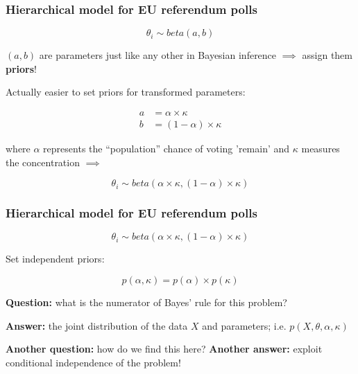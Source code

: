 \documentclass[handout]{beamer}
\begin{document}
\begin{frame}
	\frametitle{Hierarchical model for EU referendum polls}
	\begin{equation}
	\theta_i \sim beta(a,b)
	\end{equation} 
	
	 $(a,b)$ are parameters just like any other in Bayesian inference $\implies$ assign them \textbf{priors}!
	
	 Actually easier to set priors for transformed parameters:
	
	\begin{align*}
	a &= \alpha \times \kappa\\
	b &= (1-\alpha) \times \kappa
	\end{align*}
	
	 where $\alpha$ represents the ``population'' chance of voting 'remain' and $\kappa$ measures the concentration $\implies$
	
	\begin{equation}
	\theta_i \sim beta(\alpha \times \kappa,(1-\alpha) \times \kappa)
	\end{equation}
	
\end{frame}

\begin{frame}
	\frametitle{Hierarchical model for EU referendum polls}
	
	\begin{equation}
	\theta_i \sim beta(\alpha \times \kappa,(1-\alpha) \times \kappa)
	\end{equation}
	
	 Set independent priors:
	
	\begin{equation}
	p(\alpha,\kappa) = p(\alpha) \times p(\kappa)
	\end{equation}
	
	\textbf{Question:} what is the numerator of Bayes' rule for this problem? 
	
	 \textbf{Answer:} the joint distribution of the data $X$ and parameters; i.e. $p(X,\theta,\alpha,\kappa)$
	
	 \textbf{Another question:} how do we find this here? 	\onslide<6-> \textbf{Another answer:} exploit conditional independence of the problem!
	
\end{frame}
\end{document}
